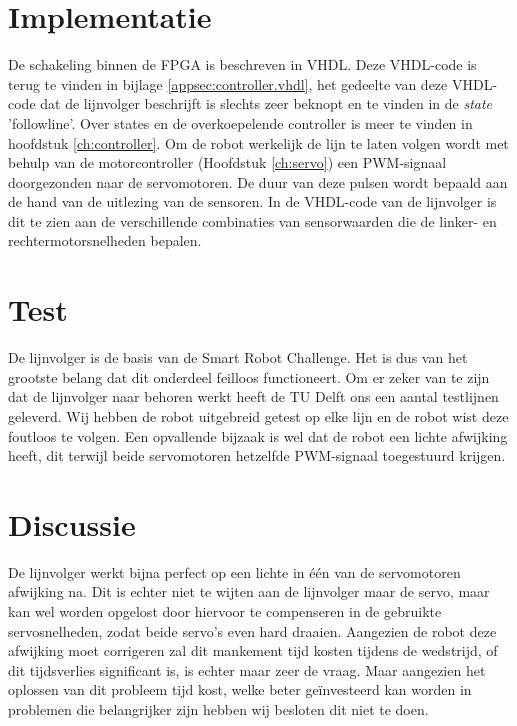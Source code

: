 \documentclass{report}
\begin{document}
\section{Implementatie}
De schakeling binnen de FPGA is beschreven in VHDL.
Deze VHDL-code is terug te vinden in bijlage \ref{appsec:controller.vhdl}, het gedeelte van deze VHDL-code dat de lijnvolger beschrijft is slechts zeer beknopt en te vinden in de \textit{state} 'followline'. 
Over states en de overkoepelende controller is meer te vinden in hoofdstuk \ref{ch:controller}.
Om de robot werkelijk de lijn te laten volgen wordt met behulp van de motorcontroller (Hoofdstuk \ref{ch:servo}) een PWM-signaal doorgezonden naar de servomotoren.
De duur van deze pulsen wordt bepaald aan de hand van de uitlezing van de sensoren.
In de VHDL-code van de lijnvolger is dit te zien aan de verschillende combinaties van sensorwaarden die de linker- en rechtermotorsnelheden bepalen.

\section{Test}
De lijnvolger is de basis van de Smart Robot Challenge.
Het is dus van het grootste belang dat dit onderdeel feilloos functioneert.
Om er zeker van te zijn dat de lijnvolger naar behoren werkt heeft de TU Delft ons een aantal testlijnen geleverd.
Wij hebben de robot uitgebreid getest op elke lijn en de robot wist deze foutloos te volgen.
Een opvallende bijzaak is wel dat de robot een lichte afwijking heeft, dit terwijl beide servomotoren hetzelfde PWM-signaal toegestuurd krijgen.

\newpage
\section{Discussie}
De lijnvolger werkt bijna perfect op een lichte in één van de servomotoren afwijking na. Dit is echter niet te wijten aan de lijnvolger maar de servo, maar kan wel worden opgelost door hiervoor te compenseren in de gebruikte servosnelheden, zodat beide servo's even hard draaien.
Aangezien de robot deze afwijking moet corrigeren zal dit mankement tijd kosten tijdens de wedstrijd, of dit tijdsverlies significant is, is echter maar zeer de vraag.
Maar aangezien het oplossen van dit probleem tijd kost, welke beter geïnvesteerd kan worden in problemen die belangrijker zijn hebben wij besloten dit niet te doen.
\end{document}
